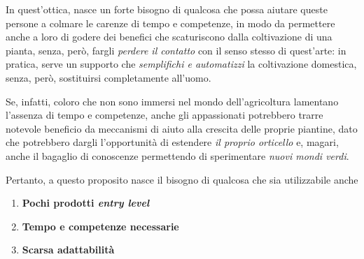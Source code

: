 In quest'ottica, nasce un forte bisogno di qualcosa che possa aiutare queste persone a colmare le carenze di tempo e competenze, in modo da permettere anche a loro di godere dei benefici che scaturiscono dalla coltivazione di una pianta, senza, però, fargli \textit{perdere il contatto} con il senso stesso di quest'arte: in pratica, serve un supporto che \textit{semplifichi e automatizzi} la coltivazione domestica, senza, però, sostituirsi completamente all'uomo.

Se, infatti, coloro che non sono immersi nel mondo dell'agricoltura lamentano l'assenza di tempo e competenze, anche gli appassionati potrebbero trarre notevole beneficio da meccanismi di aiuto alla crescita delle proprie piantine, dato che potrebbero dargli l'opportunità di estendere \textit{il proprio orticello} e, magari, anche il bagaglio di conoscenze permettendo di sperimentare \textit{nuovi mondi verdi}.

Pertanto, a questo proposito nasce il bisogno di qualcosa che sia utilizzabile anche 



\begin{enumerate}
	\item \textbf{Pochi prodotti \textit{entry level}}\\
	
	\item \textbf{Tempo e competenze necessarie}\\
	
	\item \textbf{Scarsa adattabilità}\\
\end{enumerate}
